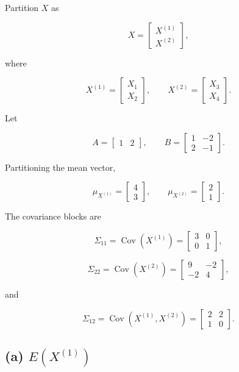 \documentclass[12pt]{article}
\begin{document}
Partition $X$ as

\[
X=
\begin{bmatrix}
X^{(1)}\\
X^{(2)}
\end{bmatrix},
\]

where

\[
X^{(1)}
=
\begin{bmatrix}
X_1\\
X_2
\end{bmatrix},
\qquad
X^{(2)}
=
\begin{bmatrix}
X_3\\
X_4
\end{bmatrix}.
\]

Let

\[
A=
\begin{bmatrix}
1&2
\end{bmatrix},
\qquad
B=
\begin{bmatrix}
1&-2\\
2&-1
\end{bmatrix}.
\]

Partitioning the mean vector,

\[
\mu_{X^{(1)}}=
\begin{bmatrix}
4\\
3
\end{bmatrix},
\qquad
\mu_{X^{(2)}}=
\begin{bmatrix}
2\\
1
\end{bmatrix}.
\]

The covariance blocks are

\[
\Sigma_{11}
=
\operatorname{Cov}(X^{(1)})
=
\begin{bmatrix}
3&0\\
0&1
\end{bmatrix},
\]

\[
\Sigma_{22}
=
\operatorname{Cov}(X^{(2)})
=
\begin{bmatrix}
9&-2\\
-2&4
\end{bmatrix},
\]

and

\[
\Sigma_{12}
=
\operatorname{Cov}(X^{(1)},X^{(2)})
=
\begin{bmatrix}
2&2\\
1&0
\end{bmatrix}.
\]

\subsection*{(a) $E(X^{(1)})$}
\end{document}
